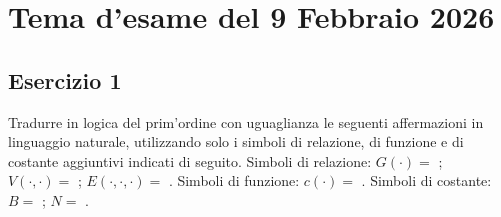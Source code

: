\section{Tema d'esame del 9 Febbraio 2026}

\subsection*{Esercizio 1}

Tradurre in logica del prim'ordine con uguaglianza le seguenti affermazioni in linguaggio naturale, utilizzando solo i simboli di relazione, di funzione e di costante aggiuntivi indicati di seguito. 
Simboli di relazione: \(G(\cdot) = \) ; \(V(\cdot, \cdot) = \) ; \(E(\cdot, \cdot, \cdot) = \) . 
Simboli di funzione: \(c(\cdot) = \) . 
Simboli di costante: \(B = \) ; \(N = \) .
